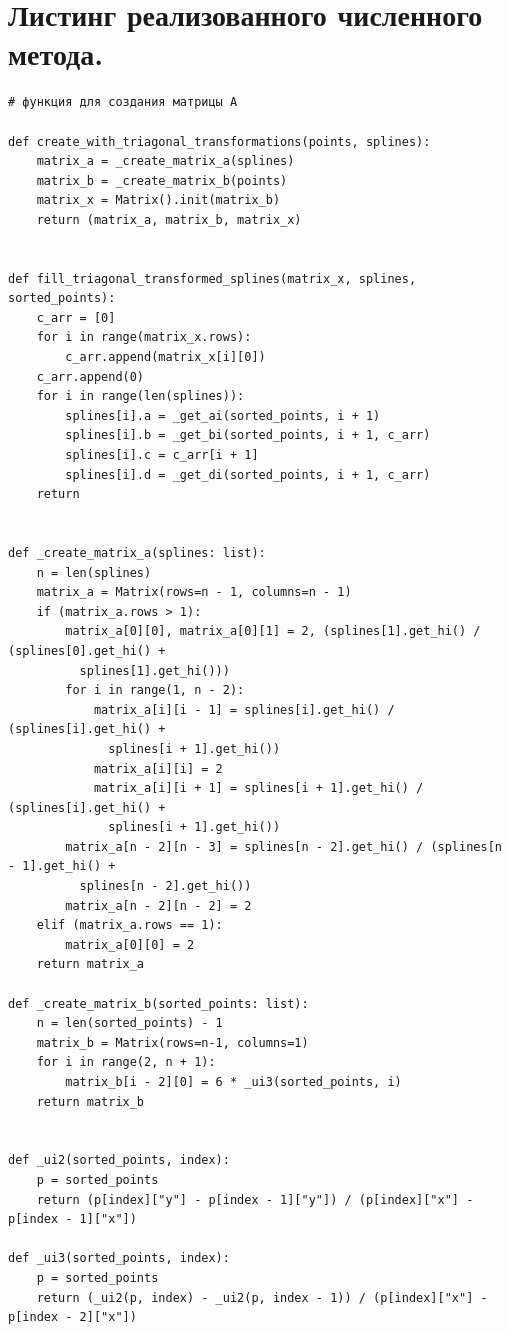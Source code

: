 \documentclass[11pt, a4paper]{article}
\begin{document}
\bigskip
\section{Листинг реализованного численного метода.}

\begin{Verbatim}[fontsize=\small]
# функция для создания матрицы A

def create_with_triagonal_transformations(points, splines):
    matrix_a = _create_matrix_a(splines)
    matrix_b = _create_matrix_b(points)
    matrix_x = Matrix().init(matrix_b)
    return (matrix_a, matrix_b, matrix_x)


def fill_triagonal_transformed_splines(matrix_x, splines, sorted_points):
    c_arr = [0]
    for i in range(matrix_x.rows):
        c_arr.append(matrix_x[i][0])
    c_arr.append(0)
    for i in range(len(splines)):
        splines[i].a = _get_ai(sorted_points, i + 1)
        splines[i].b = _get_bi(sorted_points, i + 1, c_arr)
        splines[i].c = c_arr[i + 1]
        splines[i].d = _get_di(sorted_points, i + 1, c_arr)
    return


def _create_matrix_a(splines: list):
    n = len(splines)
    matrix_a = Matrix(rows=n - 1, columns=n - 1)
    if (matrix_a.rows > 1):
        matrix_a[0][0], matrix_a[0][1] = 2, (splines[1].get_hi() / (splines[0].get_hi() + 
          splines[1].get_hi()))
        for i in range(1, n - 2):
            matrix_a[i][i - 1] = splines[i].get_hi() / (splines[i].get_hi() + 
              splines[i + 1].get_hi())
            matrix_a[i][i] = 2
            matrix_a[i][i + 1] = splines[i + 1].get_hi() / (splines[i].get_hi() + 
              splines[i + 1].get_hi())
        matrix_a[n - 2][n - 3] = splines[n - 2].get_hi() / (splines[n - 1].get_hi() + 
          splines[n - 2].get_hi())
        matrix_a[n - 2][n - 2] = 2
    elif (matrix_a.rows == 1):
        matrix_a[0][0] = 2
    return matrix_a

def _create_matrix_b(sorted_points: list):
    n = len(sorted_points) - 1
    matrix_b = Matrix(rows=n-1, columns=1)
    for i in range(2, n + 1):
        matrix_b[i - 2][0] = 6 * _ui3(sorted_points, i)
    return matrix_b


def _ui2(sorted_points, index):
    p = sorted_points
    return (p[index]["y"] - p[index - 1]["y"]) / (p[index]["x"] - p[index - 1]["x"])

def _ui3(sorted_points, index):
    p = sorted_points
    return (_ui2(p, index) - _ui2(p, index - 1)) / (p[index]["x"] - p[index - 2]["x"])



\end{Verbatim}
\end{document}
